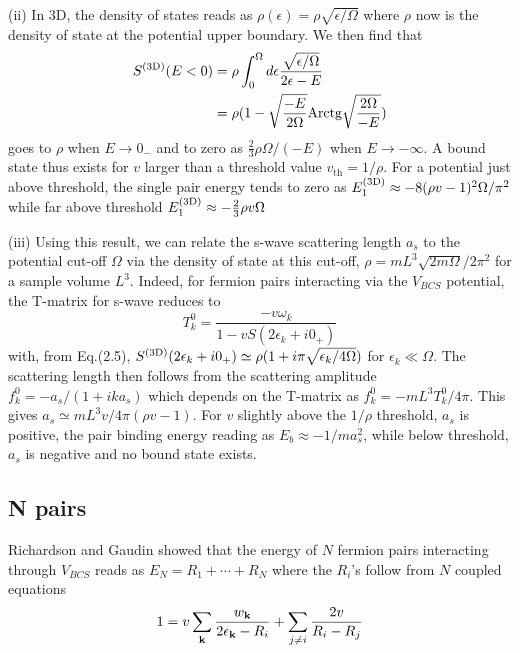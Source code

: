 \documentclass[5p,twocolumn]{elsarticle}
\begin{document}
(ii) In 3D, the density of states reads as  
$\rho(\epsilon)=\rho\sqrt{\epsilon/\Omega}$
where $\rho$ now is the density of state at the potential upper boundary. We then find that
\begin{equation}
\begin{split}
S^{{\text{(3D)}}}(E<0)&=\rho\int_0^{\Omega}{}d\epsilon\frac{\sqrt{\epsilon/\Omega}}{2\epsilon-E}\\
	&=\rho(1-\sqrt{\frac{-E}{2\Omega}}\text{Arctg}\sqrt{\frac{2\Omega}{-E}})
\label{eq:}
\end{split}
\end{equation}
goes to $\rho$ when $E\rightarrow0_-$ and to zero as $\frac{2}{3}\rho\Omega/(-E)$ when $E\rightarrow-\infty$. 
A bound state thus exists for $v$ larger than a threshold value $v_{\text{th}}=1/\rho$.  For a potential just above threshold, the single pair energy tends to zero as 
$
E_1^{{\text{(3D)}}}\approx-8(\rho v-1)^2\Omega/\pi^2
$
while far above threshold
$E_1^{{\text{(3D)}}}\approx-\frac{2}{3}\rho{v}\Omega$

(iii) Using this result, we can relate the s-wave scattering length $a_{s}$ to the potential cut-off $\Omega$ via the density of state  at this cut-off, $\rho=mL^3\sqrt{2m\Omega}/2\pi^2$ for a sample volume $L^3$. Indeed, for fermion pairs interacting via the $V_{BCS}$ potential, the T-matrix for s-wave  reduces to
\begin{equation}
T^{0}_{k}=\frac{-v\omega_k}{1-vS(2\epsilon_k+i0_+)}
\end{equation}
with, from Eq.(2.5), $S^{{\text{(3D)}}}(2\epsilon_k+i0_+)\simeq\rho(1+i\pi\sqrt{\epsilon_k/4\Omega})$  for $\epsilon_k\ll\Omega$. The scattering length then follows from the scattering amplitude $f^0_k= -a_s/(1+ika_s)$ which depends on the T-matrix as $f^0_k= -mL^3T^{0}_{k}/4\pi$. This gives $a_s\simeq mL^3v/4\pi(\rho v-1)$. For $v$ slightly above the $1/\rho $ threshold, $a_s$ is positive, the pair binding energy reading as $E_{b}\approx-1/ma_s^{2}$, while below threshold, $a_s$ is negative and no bound state exists. 

\subsection{N pairs\label{sec:NPair}}
Richardson \cite{Richardson1} and Gaudin \cite{gaudin} showed that the energy of $N$ fermion pairs interacting through $V_ {BCS}$ reads as $E_N=R_1+\cdots+R_N$ where the $R_i$'s follow from $N$ coupled equations
\begin{equation}
 1=v\sum_{\mathbf{k}}\frac{w_{\mathbf{k}}}{2\epsilon_{\mathbf{k}}-R_i}+\sum_{j\neq{}i}\frac{2v}{R_i-R_j}
\end{equation}
\end{document}
